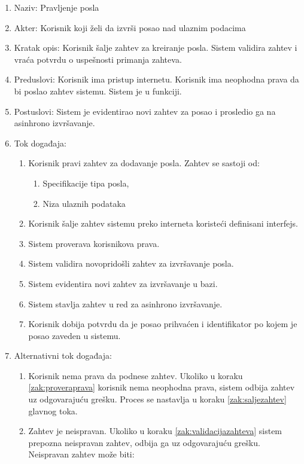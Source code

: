 \documentclass[12pt,oneside]{memoir}
\begin{document}
\begin{enumerate}
\item Naziv: Pravljenje posla
\item Akter: Korisnik koji želi da izvrši posao nad ulaznim podacima
\item Kratak opis: Korisnik šalje zahtev za kreiranje posla. Sistem validira zahtev i vraća potvrdu o uspešnosti primanja zahteva.
\item Preduslovi: Korisnik ima pristup internetu. Korisnik ima neophodna prava da bi poslao zahtev sistemu. Sistem je u funkciji.
\item Postuslovi: Sistem je evidentirao novi zahtev za posao i prosledio ga na asinhrono izvršavanje.
\item Tok događaja:
	\begin{enumerate}
	\item \label{zak:pravizahtev}Korisnik pravi zahtev za dodavanje posla. Zahtev se sastoji od:
		\begin{enumerate}
		\item Specifikacije tipa posla,
		\item Niza ulaznih podataka
		\end{enumerate}
	\item \label{zak:saljezahtev} Korisnik šalje zahtev sistemu preko interneta koristeći definisani interfejs.
	\item \label{zak:proveraprava} Sistem proverava korisnikova prava.
	\item \label{zak:validacijazahteva} Sistem validira novopridošli zahtev za izvršavanje posla.
	\item Sistem evidentira novi zahtev za izvršavanje u bazi.
	\item \label{zak:asinhzakazivanje} Sistem stavlja zahtev u red za asinhrono izvršavanje.
	\item Korisnik dobija potvrdu da je posao prihvaćen i identifikator po kojem je posao zaveden u sistemu.
	\end{enumerate}
\item Alternativni tok događaja:
	\begin{enumerate}
	\item Korisnik nema prava da podnese zahtev. Ukoliko u koraku \ref{zak:proveraprava} korisnik nema neophodna prava, sistem odbija zahtev uz odgovarajuću grešku. Proces se nastavlja u koraku \ref{zak:saljezahtev} glavnog toka.
	\item Zahtev je neispravan. Ukoliko u koraku \ref{zak:validacijazahteva} sistem prepozna neispravan zahtev, odbija ga uz odgovarajuću grešku. Neispravan zahtev može biti:

\end{enumerate}
\end{enumerate}
\end{document}
